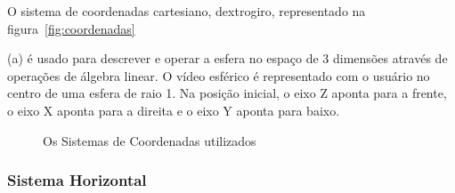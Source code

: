 O sistema de coordenadas cartesiano, dextrogiro, representado na figura~\ref{fig:coordenadas}{(a) é usado para descrever e operar a esfera no espaço de 3 dimensões através de operações de álgebra linear. O vídeo esférico é representado com o usuário no centro de uma esfera de raio 1. Na posição inicial, o eixo Z aponta para a frente, o eixo X aponta para a direita e o eixo Y aponta para baixo.
	
	\begin{figure}[htbp]
		\centering
		
		 \quad
		 \quad
		 \quad
		
		\caption{Os Sistemas de Coordenadas utilizados}
		\label{fig:coord_sis}
	\end{figure}
	
	
	\subsubsection{Sistema Horizontal}
	
}
